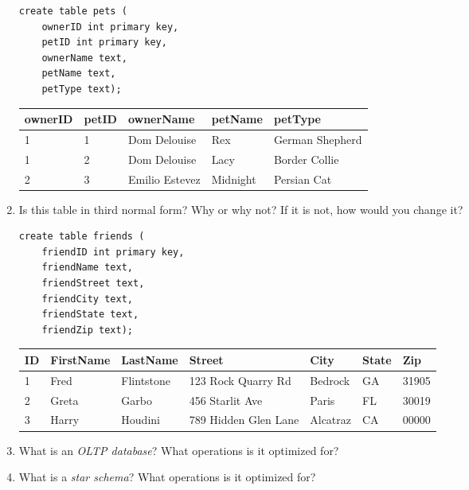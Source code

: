 \documentclass{article}
\begin{document}
\begin{enumerate}
            \begin{verbatim}
create table pets (
    ownerID int primary key,
    petID int primary key,
    ownerName text,
    petName text,
    petType text);
            \end{verbatim}

            \begin{tabular}{| l | l | l | l | l |}
\hline
\textbf{ownerID} & \textbf{petID} & \textbf{ownerName}  & \textbf{petName} & \textbf{petType} \\
\hline
1 & 1 & Dom Delouise & Rex & German Shepherd \\
\hline
1 & 2 & Dom Delouise & Lacy & Border Collie \\
\hline
2 & 3 & Emilio Estevez & Midnight & Persian Cat \\
\hline
            \end{tabular}

        \item Is this table in third normal form? Why or why not? If it is not, how would you change it?

            \begin{verbatim}
create table friends (
    friendID int primary key,
    friendName text,
    friendStreet text,
    friendCity text,
    friendState text,
    friendZip text);
            \end{verbatim}

            \begin{tabular}{| l | l | l | l | l | l | l |}
\hline
\textbf{ID} & \textbf{FirstName} & \textbf{LastName} & \textbf{Street}  & \textbf{City} & \textbf{State} & \textbf{Zip} \\
\hline
1 & Fred & Flintstone & 123 Rock Quarry Rd & Bedrock & GA & 31905 \\  
\hline
2 & Greta & Garbo & 456 Starlit Ave & Paris & FL & 30019 \\  
\hline
3 & Harry & Houdini & 789 Hidden Glen Lane & Alcatraz & CA & 00000 \\  
\hline
            \end{tabular}

        \item What is an \textit{OLTP database}? What operations is it optimized for?


        \item What is a \textit{star schema}? What operations is it optimized for?


    \end{enumerate}
\end{document}
